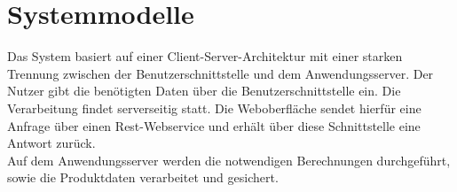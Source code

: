 \section{Systemmodelle}
\begin{center}
	\resizebox{\textwidth}{!} {
		
	}
\end{center}
Das System basiert auf einer Client-Server-Architektur mit einer starken Trennung zwischen der Benutzerschnittstelle und dem Anwendungsserver. Der Nutzer gibt die benötigten Daten über die Benutzerschnittstelle ein. Die Verarbeitung findet serverseitig statt. Die Weboberfläche sendet hierfür eine Anfrage über einen \gls{Rest}-\gls{Webservice}
 und erhält über diese Schnittstelle eine Antwort zurück. \\
Auf dem Anwendungsserver werden die notwendigen Berechnungen durchgeführt, sowie die Produktdaten verarbeitet und gesichert.